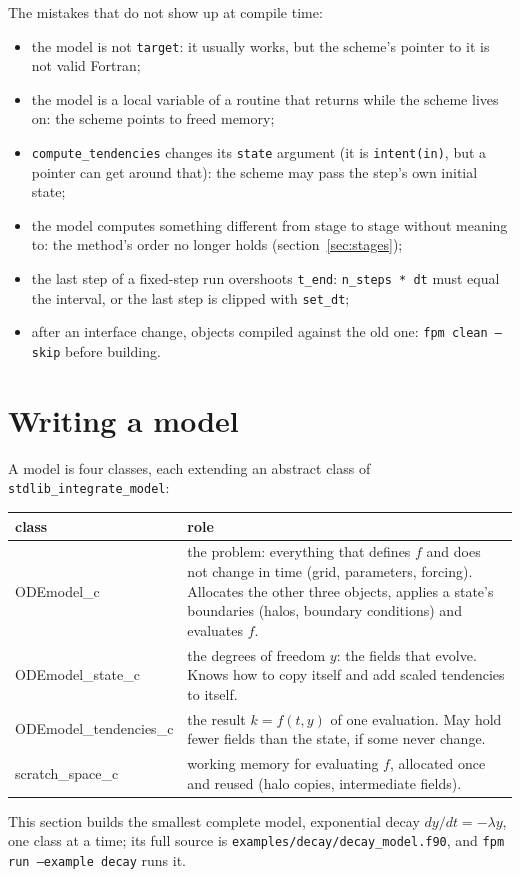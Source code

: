 \documentclass[11pt,a4paper]{article}
\newcommand{\code}[1]{\texttt{#1}}
\begin{document}
The mistakes that do not show up at compile time:
\begin{itemize}
  \item the model is not \code{target}: it usually works, but the scheme's
    pointer to it is not valid Fortran;
  \item the model is a local variable of a routine that returns while the
    scheme lives on: the scheme points to freed memory;
  \item \code{compute\_tendencies} changes its \code{state} argument (it is
    \code{intent(in)}, but a pointer can get around that): the scheme may
    pass the step's own initial state;
  \item the model computes something different from stage to stage without
    meaning to: the method's order no longer holds (section~\ref{sec:stages});
  \item the last step of a fixed-step run overshoots \code{t\_end}:
    \code{n\_steps * dt} must equal the interval, or the last step is
    clipped with \code{set\_dt};
  \item after an interface change, objects compiled against the old one:
    \code{fpm clean --skip} before building.
\end{itemize}

\section{Writing a model}
\label{sec:model}

A model is four classes, each extending an abstract class of
\code{stdlib\_integrate\_model}:
\begin{center}
\renewcommand{\arraystretch}{1.25}
\begin{tabular}{>{\ttfamily}l p{9.6cm}}
  \toprule
  \normalfont class & role \\
  \midrule
  ODEmodel\_c            & the problem: everything that defines $f$ and does not change
                           in time (grid, parameters, forcing). Allocates the other three
                           objects, applies a state's boundaries (halos, boundary conditions) and
                           evaluates $f$. \\
  ODEmodel\_state\_c     & the degrees of freedom $y$: the fields that evolve. Knows how to
                           copy itself and add scaled tendencies to itself. \\
  ODEmodel\_tendencies\_c & the result $k = f(t, y)$ of one evaluation. May hold fewer
                           fields than the state, if some never change. \\
  scratch\_space\_c      & working memory for evaluating $f$, allocated once and reused
                           (halo copies, intermediate fields). \\
  \bottomrule
\end{tabular}
\end{center}
This section builds the smallest complete model, exponential decay
$dy/dt = -\lambda y$, one class at a time; its full source is
\code{examples/decay/decay\_model.f90}, and \code{fpm run --example decay}
runs it.
\end{document}
